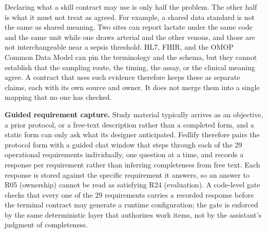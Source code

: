 \documentclass[preprint,5p, 10pt, times]{elsarticle}
\begin{document}
Declaring what a skill contract may use is only half the problem. The other half is what it must not treat as agreed.
For example, a shared data standard is not the same as shared meaning. Two sites can report lactate under the same code and the same unit while one draws arterial and the other venous, and those are not interchangeable near a sepsis threshold. HL7, FHIR, and the OMOP Common Data Model can pin the terminology and the schema, but they cannot establish that the sampling route, the timing, the assay, or the clinical meaning agree. A contract that uses such evidence therefore keeps these as separate claims, each with its own source and owner. It does not merge them into a single mapping that no one has checked.


\textbf{Guided requirement capture.}
Study material typically arrives as an objective, a prior protocol, or a free-text description rather than a completed form, and a static form can only ask what its designer anticipated. Fedlify therefore pairs the protocol form with a guided chat window that steps through each of the 29 operational requirements individually, one question at a time, and records a response per requirement rather than inferring completeness from free text. Each response is stored against the specific requirement it answers, so an answer to R05 (ownership) cannot be read as satisfying R24 (evaluation). A code-level gate checks that every one of the 29 requirements carries a recorded response before the terminal contract may generate a runtime configuration; the gate is enforced by the same deterministic layer that authorizes work items, not by the assistant's judgment of completeness.
\end{document}
